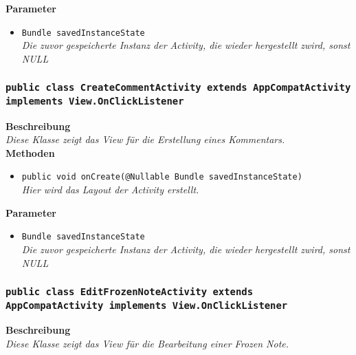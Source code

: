 \documentclass[a4paper]{scrreprt}
\begin{document}
                \textbf{Parameter}
                \begin{itemize}
        		\item\texttt{Bundle savedInstanceState}\\ 
                \textit{Die zuvor gespeicherte Instanz der Activity, die wieder hergestellt zwird, sonst NULL}\\
                \end{itemize} 
        
        \subsubsection{\texttt{public class CreateCommentActivity extends AppCompatActivity implements View.OnClickListener}}
               
               	\textbf{Beschreibung} \\
      	        \textit{Diese Klasse zeigt das View für die Erstellung eines Kommentars.} \\
                
                \textbf{Methoden}
                \begin{itemize}
        		\item\texttt{{public void onCreate(@Nullable Bundle savedInstanceState)}}\\
                \textit{Hier wird das Layout der Activity erstellt.}\\
                \end{itemize}
                
                \textbf{Parameter}
                \begin{itemize}
        		\item\texttt{Bundle savedInstanceState}\\  
                \textit{Die zuvor gespeicherte Instanz der Activity, die wieder hergestellt zwird, sonst NULL}\\
                \end{itemize} 
                
                
        \subsubsection{\texttt{public class EditFrozenNoteActivity extends AppCompatActivity implements View.OnClickListener}}
               
               	\textbf{Beschreibung} \\
      	        \textit{Diese Klasse zeigt das View für die Bearbeitung einer Frozen Note.} \\
                
\end{document}
